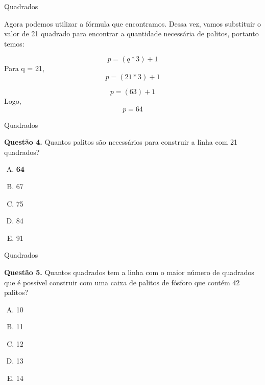 \documentclass{beamer}
\begin{document}
\begin{frame}{Quadrados}

Agora podemos utilizar a fórmula que encontramos. Dessa vez, vamos substituir o valor de 21 quadrado para encontrar a quantidade necessária de palitos, portanto temos:

\begin{equation*}
    p = (q \ast 3) + 1
\end{equation*}
Para q = 21,
\begin{equation*}
    p = (21 \ast 3) + 1
\end{equation*}

\begin{equation*}
    p = (63) + 1
\end{equation*}
Logo, 
\begin{equation*}
    p = 64
\end{equation*}
\end{frame}


\begin{frame}{Quadrados}

\textbf{Questão 4.} Quantos palitos são necessários
para construir a linha com 21 quadrados?
\begin{enumerate}[(A)]
    \item \textbf{64}
    \item 67
    \item 75
    \item 84
    \item 91
\end{enumerate}

\end{frame}


\begin{frame}{Quadrados}

\textbf{Questão 5.} Quantos quadrados tem a linha com o maior número de quadrados que é possível construir com uma caixa de palitos de  fósforo que contém 42 palitos?

\begin{enumerate}[(A)]
    \item 10
    \item 11
    \item 12
    \item 13
    \item 14
\end{enumerate}
\end{frame}
\end{document}

